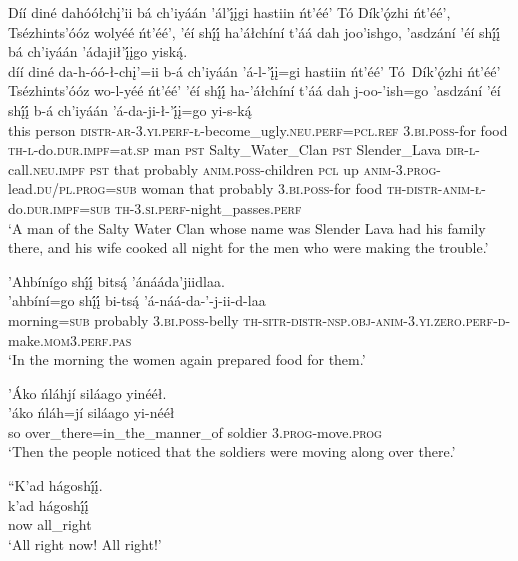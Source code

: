 \ea\label{ex:text1-46-1}
Díí diné dahóółchį’ii bá ch’iyáán ’ál’į́įgi hastiin ńt’éé’ Tó Dík’ǫ́zhi ńt’éé’, Tsézhints’óóz wolyéé ńt’éé’, ’éí shį́į́ ha’áłchíní t’áá dah joo’ishgo, ’asdzání ’éí shį́į́ bá ch’iyáán ’ádajił’į́įgo yiską́.\\
\gll díí	diné	da-h-óó-ł-chį’=ii	b-á	ch’iyáán	’á-l-’į́į=gi	hastiin	ńt’éé’	Tó~{Dík’ǫ́zhi}	ńt’éé’	Tsézhints’óóz	wo-l-yéé	ńt’éé’	’éí	shį́į́	ha-’áłchíní	t’áá	dah	j-oo-’ish=go	’asdzání	’éí	shį́į́	b-á	ch’iyáán	’á-da-ji-ł-’į́į=go	yi-s-ką́\\
     this	person	\textsc{distr}-\textsc{ar}-3.\textsc{yi}.\textsc{perf}-\textsc{ł}-become\_ugly.\textsc{neu}.\textsc{perf}=\textsc{pcl}.\textsc{ref}	3.\textsc{bi}.\textsc{poss}-for	food	\textsc{th}-\textsc{l}-do.\textsc{dur}.\textsc{impf}=at.\textsc{sp}	man	\textsc{pst}	Salty\_Water\_Clan	\textsc{pst}	Slender\_Lava	\textsc{dir}-\textsc{l}-call.\textsc{neu}.\textsc{impf}	\textsc{pst}	that	probably	\textsc{anim}.\textsc{poss}-children	\textsc{pcl}	up	\textsc{anim}-3.\textsc{prog}-lead.\textsc{du}/\textsc{pl}.\textsc{prog}=\textsc{sub}	woman	that	probably	3.\textsc{bi}.\textsc{poss}-for	food	\textsc{th}-\textsc{distr}-\textsc{anim}-\textsc{ł}-do.\textsc{dur}.\textsc{impf}=\textsc{sub}	\textsc{th}-3.\textsc{si}.\textsc{perf}-night\_passes.\textsc{perf}\\
\glt `A man of the Salty Water Clan whose name was Slender Lava had his family there, and his wife cooked all night for the men who were making the trouble.'
\z

\ea\label{ex:text1-46-2}
’Ahbínígo shį́į́ bitsą́ ’ánááda’jiidlaa.\\
\gll ’ahbíní=go	shį́į́	bi-tsą́	’á-náá-da-’-j-ii-d-laa\\
     morning=\textsc{sub}	probably	3.\textsc{bi}.\textsc{poss}-belly	\textsc{th}-\textsc{sitr}-\textsc{distr}-\textsc{nsp}.\textsc{obj}-\textsc{anim}-3.\textsc{yi}.\textsc{zero}.\textsc{perf}-\textsc{d}-make.\textsc{mom}3.\textsc{perf}.\textsc{pas}\\
\glt `In the morning the women again prepared food for them.'
\z

\ea\label{ex:text1-46-3}
’Áko ńláhjí siláago yinééł.\\
\gll ’áko	ńláh=jí	siláago	yi-nééł\\
     so	over\_there=in\_the\_manner\_of	soldier	3.\textsc{prog}-move.\textsc{prog}\\
\glt `Then the people noticed that the soldiers were moving along over there.'
\z

\ea\label{ex:text1-47-1}
``K’ad hágoshį́į́.\\
\gll k’ad	hágoshį́į́\\
     now	all\_right\\
\glt `All right now! All right!'
\z

